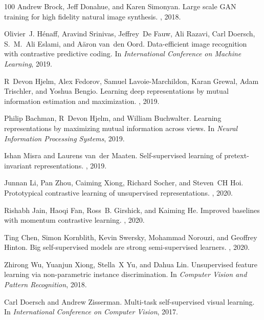 \documentclass{article}
\begin{document}
{\begin{thebibliography}{100}
Andrew Brock, Jeff Donahue, and Karen Simonyan.
\newblock Large scale {GAN} training for high fidelity natural image synthesis.
, 2018.

Olivier~J. H{\'e}naff, Aravind Srinivas, Jeffrey~De Fauw, Ali Razavi, Carl
  Doersch, S.~M.~Ali Eslami, and A{\"a}ron van~den Oord.
\newblock Data-efficient image recognition with contrastive predictive coding.
\newblock In {\em International Conference on Machine Learning}, 2019.

R~Devon Hjelm, Alex Fedorov, Samuel Lavoie-Marchildon, Karan Grewal, Adam
  Trischler, and Yoshua Bengio.
\newblock Learning deep representations by mutual information estimation and
  maximization.
, 2019.

Philip Bachman, R~Devon Hjelm, and William Buchwalter.
\newblock Learning representations by maximizing mutual information across
  views.
\newblock In {\em Neural Information Processing Systems}, 2019.

Ishan Misra and Laurens van~der Maaten.
\newblock Self-supervised learning of pretext-invariant representations.
, 2019.

Junnan Li, Pan Zhou, Caiming Xiong, Richard Socher, and Steven~CH Hoi.
\newblock Prototypical contrastive learning of unsupervised representations.
, 2020.

Rishabh Jain, Haoqi Fan, Ross~B. Girshick, and Kaiming He.
\newblock Improved baselines with momentum contrastive learning.
, 2020.

Ting Chen, Simon Kornblith, Kevin Swersky, Mohammad Norouzi, and Geoffrey
  Hinton.
\newblock Big self-supervised models are strong semi-supervised learners.
, 2020.

Zhirong Wu, Yuanjun Xiong, Stella~X Yu, and Dahua Lin.
\newblock Unsupervised feature learning via non-parametric instance
  discrimination.
\newblock In {\em Computer Vision and Pattern Recognition}, 2018.

Carl Doersch and Andrew Zisserman.
\newblock Multi-task self-supervised visual learning.
\newblock In {\em International Conference on Computer Vision}, 2017.


\end{thebibliography}}
\end{document}
